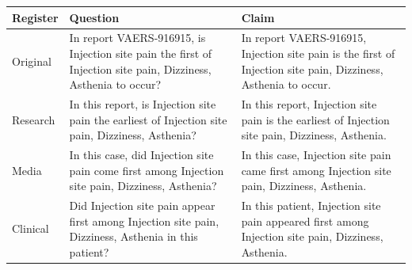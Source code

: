 \documentclass[11pt]{article}
\begin{document}
\begin{tabularx}{\linewidth}{@{}l L L@{}}
\toprule
\textbf{Register} & \textbf{Question} & \textbf{Claim} \\
\midrule
Original & In report VAERS-916915, is Injection site pain the first of Injection site pain, Dizziness, Asthenia to occur? & In report VAERS-916915, Injection site pain is the first of Injection site pain, Dizziness, Asthenia to occur. \\
Research & In this report, is Injection site pain the earliest of Injection site pain, Dizziness, Asthenia? & In this report, Injection site pain is the earliest of Injection site pain, Dizziness, Asthenia. \\
Media & In this case, did Injection site pain come first among Injection site pain, Dizziness, Asthenia? & In this case, Injection site pain came first among Injection site pain, Dizziness, Asthenia. \\
Clinical & Did Injection site pain appear first among Injection site pain, Dizziness, Asthenia in this patient? & In this patient, Injection site pain appeared first among Injection site pain, Dizziness, Asthenia. \\
\bottomrule
\end{tabularx}
\vspace{3pt}
\end{document}
